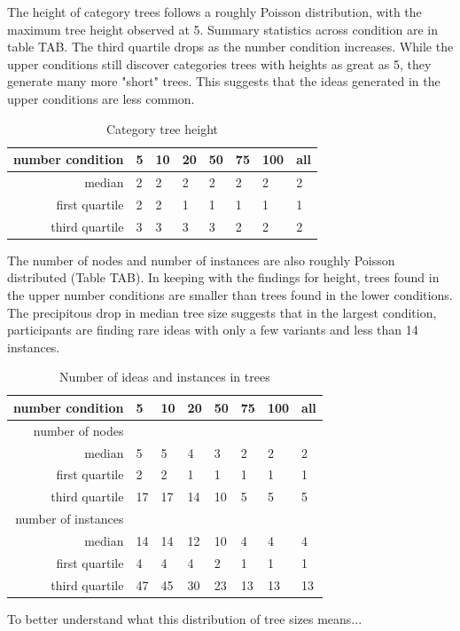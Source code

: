 The height of category trees follows a roughly Poisson distribution, with the maximum tree height observed at 5. Summary statistics across condition are in table TAB. The third quartile drops as the number condition increases. While the upper conditions still discover categories trees with heights as great as 5, they generate many more "short" trees. This suggests that the ideas generated in the upper conditions are less common.

\begin{table}
	\begin{tabular}[h!]{r | l l l l l l l}
	\textbf{number condition} & 5 & 10 & 20 & 50 & 75 & 100 & all \\ \hline \hline
	median & 2 & 2 & 2 & 2 & 2 & 2 & 2\\
	first quartile & 2 & 2  & 1 & 1 & 1 & 1 & 1\\
	third quartile & 3 & 3 &3 &3 &2 &2 & 2\\
	\end{tabular}
	\caption{Category tree height}
\end{table}

The number of nodes and number of instances are also roughly Poisson distributed (Table TAB). In keeping with the findings for height, trees found in the upper number conditions are smaller than trees found in the lower conditions. The precipitous drop in median tree size suggests that in the largest condition, participants are finding rare ideas with only a few variants and less than 14 instances.

\begin{table}
\begin{tabular}[h!]{r | l l l l l l l}
	\textbf{number condition} & 5 & 10 & 20 & 50 & 75 & 100 & all \\ \hline \hline
	number of nodes& \\ \hline
    median &5&5&4&3&2&2&2 \\
	first quartile &2&2&1&1&1&1&1 \\
	third quartile &17&17&14&10&5&5&5 \\
	number of instances& \\ \hline
	median &14&14&12&10&4&4&4 \\
    first quartile &4&4&4&2&1&1&1 \\
	third quartile &47&45&30&23&13&13&13 \\
	\end{tabular}
	\caption{Number of ideas and instances in trees}
\end{table}

To better understand what this distribution of tree sizes means...
